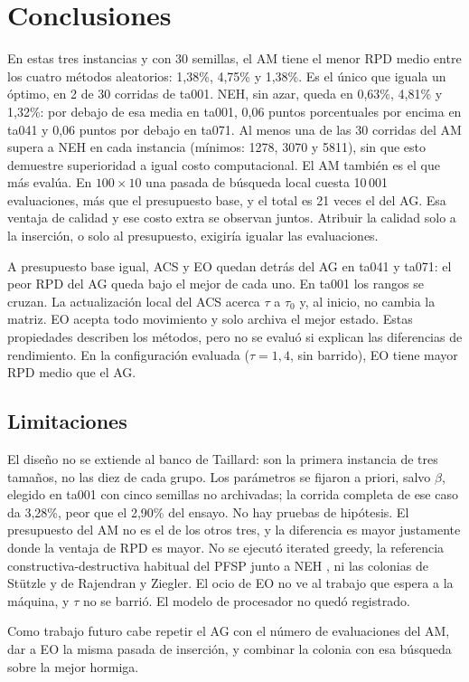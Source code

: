 \documentclass[journal]{IEEEtran}
\begin{document}
\section{Conclusiones}\label{sec:conclusiones}
En estas tres instancias y con 30 semillas, el AM tiene el menor RPD medio entre los cuatro métodos aleatorios: 1,38\%, 4,75\% y 1,38\%. Es el único que iguala un óptimo, en 2 de 30 corridas de ta001. NEH, sin azar, queda en 0,63\%, 4,81\% y 1,32\%: por debajo de esa media en ta001, 0,06 puntos porcentuales por encima en ta041 y 0,06 puntos por debajo en ta071. Al menos una de las 30 corridas del AM supera a NEH en cada instancia (mínimos: 1278, 3070 y 5811), sin que esto demuestre superioridad a igual costo computacional. El AM también es el que más evalúa. En $100\times10$ una pasada de búsqueda local cuesta 10\,001 evaluaciones, más que el presupuesto base, y el total es 21 veces el del AG. Esa ventaja de calidad y ese costo extra se observan juntos. Atribuir la calidad solo a la inserción, o solo al presupuesto, exigiría igualar las evaluaciones.

A presupuesto base igual, ACS y EO quedan detrás del AG en ta041 y ta071: el peor RPD del AG queda bajo el mejor de cada uno. En ta001 los rangos se cruzan. La actualización local del ACS acerca $\tau$ a $\tau_0$ y, al inicio, no cambia la matriz. EO acepta todo movimiento y solo archiva el mejor estado. Estas propiedades describen los métodos, pero no se evaluó si explican las diferencias de rendimiento. En la configuración evaluada ($\tau=1{,}4$, sin barrido), EO tiene mayor RPD medio que el AG.

\subsection{Limitaciones}
El diseño no se extiende al banco de Taillard: son la primera instancia de tres tamaños, no las diez de cada grupo. Los parámetros se fijaron a priori, salvo $\beta$, elegido en ta001 con cinco semillas no archivadas; la corrida completa de ese caso da 3,28\%, peor que el 2,90\% del ensayo. No hay pruebas de hipótesis. El presupuesto del AM no es el de los otros tres, y la diferencia es mayor justamente donde la ventaja de RPD es mayor. No se ejecutó iterated greedy, la referencia constructiva-destructiva habitual del PFSP junto a NEH \cite{ruiz_iterated_2007}, ni las colonias de Stützle y de Rajendran y Ziegler. El ocio de EO no ve al trabajo que espera a la máquina, y $\tau$ no se barrió. El modelo de procesador no quedó registrado.

Como trabajo futuro cabe repetir el AG con el número de evaluaciones del AM, dar a EO la misma pasada de inserción, y combinar la colonia con esa búsqueda sobre la mejor hormiga.



\end{document}
